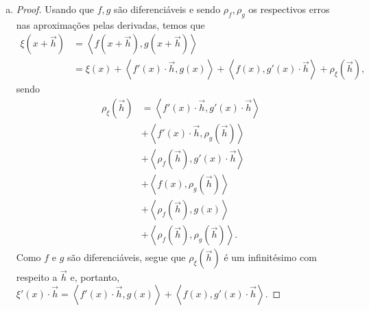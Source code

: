 \documentclass[12pt,a4paper]{article}
\begin{document}
\begin{enumerate}[a)]
\begin{proof}
\begin{align*}
            \end{align*}
            Como $f,g$ são funcionais lineares, segue que
            \begin{equation*}
                \frac{f(\vec{v})\cdot g(\vec{v})}{\|\vec{v}\|} \xrightarrow{\vec{v}\to \vec{0}} 0
            \end{equation*}
            e, portanto, a derivada $\varphi'(x)\cdot \vec{v}$ existe e é 
            $f(x)\cdot g(\vec{v}) + g(x)\cdot f(\vec{v})$.
        \end{proof}
        \item 
        \begin{proof}
            Usando que $f,g$ são diferenciáveis e sendo $\rho_f, \rho_g$ os respectivos erros nas
            aproximações pelas derivadas, temos que 
            \begin{align*}
                \xi(x+\vec{h}) &= \left\langle f(x+\vec{h}), g(x+\vec{h}) \right\rangle \\
                               &= \xi(x) + \left\langle f'(x)\cdot\vec{h}, g(x) \right\rangle 
                               + \left\langle f(x), g'(x)\cdot\vec{h} \right\rangle
                               + \rho_{\xi}(\vec{h}),
            \end{align*}
            sendo
            \begin{align*}
                \rho_{\xi}(\vec{h}) &= \left\langle f'(x)\cdot\vec{h}, g'(x)\cdot\vec{h} \right\rangle \\
                                    &+ \left\langle f'(x)\cdot\vec{h}, \rho_g(\vec{h}) \right\rangle \\
                                    &+ \left\langle \rho_f(\vec{h}), g'(x)\cdot\vec{h} \right\rangle \\
                                    &+ \left\langle f(x), \rho_g(\vec{h}) \right\rangle \\
                                    &+ \left\langle \rho_f(\vec{h}), g(x) \right\rangle \\
                                    &+ \left\langle \rho_f(\vec{h}), \rho_g(\vec{h}) \right\rangle.
            \end{align*}
            Como $f$ e $g$ são diferenciáveis, segue que $\rho_{\xi}(\vec{h})$ é um infinitésimo com
            respeito a $\vec{h}$ e, portanto, $\xi'(x)\cdot\vec{h} = \left\langle f'(x)\cdot\vec{h}, 
            g(x) \right\rangle + \left\langle f(x), g'(x)\cdot\vec{h} \right\rangle$.
        \end{proof}
    \end{enumerate}
%
\end{document}
